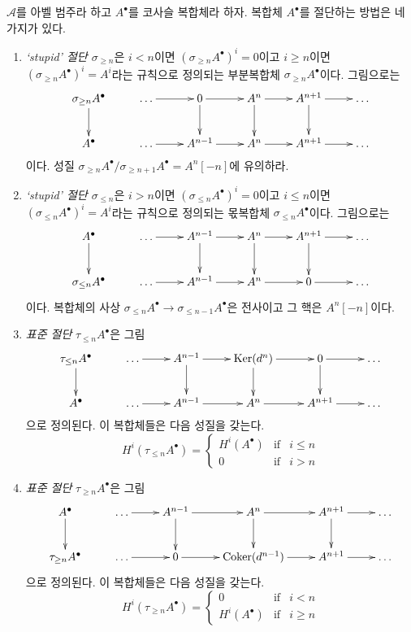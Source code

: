 \noindent
$\mathcal{A}$를 아벨 범주라 하고 $A^\bullet$를 코사슬 복합체라 하자.
복합체 $A^\bullet$를 절단하는 방법은 네 가지가 있다.
\begin{enumerate}
\item {\it ‘stupid’ 절단 $\sigma_{\geq n}$}은
$i < n$이면 $(\sigma_{\geq n} A^\bullet)^i = 0$이고
$i \geq n$이면 $(\sigma_{\geq n} A^\bullet)^i = A^i$라는 규칙으로
정의되는 부분복합체 $\sigma_{\geq n} A^\bullet$이다. 그림으로는
$$
\xymatrix{
\sigma_{\geq n}A^\bullet \ar[d]  &
\ldots \ar[r] &
0 \ar[r] \ar[d] &
A^n \ar[r] \ar[d] &
A^{n + 1} \ar[r] \ar[d] &
\ldots \\
A^\bullet  &
\ldots \ar[r] &
A^{n - 1} \ar[r] &
A^n \ar[r] &
A^{n + 1} \ar[r] &
\ldots
}
$$
이다. 성질
$\sigma_{\geq n}A^\bullet / \sigma_{\geq n + 1}A^\bullet
= A^n[-n]$에 유의하라.
\item {\it ‘stupid’ 절단 $\sigma_{\leq n}$}은
$i > n$이면 $(\sigma_{\leq n} A^\bullet)^i = 0$이고
$i \leq n$이면 $(\sigma_{\leq n} A^\bullet)^i = A^i$라는 규칙으로
정의되는 몫복합체 $\sigma_{\leq n} A^\bullet$이다. 그림으로는
$$
\xymatrix{
A^\bullet \ar[d]  &
\ldots \ar[r] &
A^{n - 1} \ar[r] \ar[d] &
A^n \ar[r] \ar[d] &
A^{n + 1} \ar[r] \ar[d] &
\ldots \\
\sigma_{\leq n}A^\bullet &
\ldots \ar[r] &
A^{n - 1} \ar[r] &
A^n \ar[r] &
0 \ar[r] &
\ldots \\
}
$$
이다. 복합체의 사상
$\sigma_{\leq n}A^\bullet \to \sigma_{\leq n - 1}A^\bullet$은
전사이고 그 핵은 $A^n[-n]$이다.
\item {\it 표준 절단} $\tau_{\leq n}A^\bullet$은 그림
$$
\xymatrix{
\tau_{\leq n}A^\bullet \ar[d]  &
\ldots \ar[r] &
A^{n - 1} \ar[r] \ar[d] &
\Ker(d^n) \ar[r] \ar[d] &
0 \ar[r] \ar[d] &
\ldots \\
A^\bullet  &
\ldots \ar[r] &
A^{n - 1} \ar[r] &
A^n \ar[r] &
A^{n + 1} \ar[r] &
\ldots
}
$$
으로 정의된다. 이 복합체들은 다음 성질을 갖는다.
$$
H^i(\tau_{\leq n}A^\bullet) =
\left\{
\begin{matrix}
H^i(A^\bullet) & \text{if} & i \leq n \\
0 & \text{if} & i > n
\end{matrix}
\right.
$$
\item {\it 표준 절단} $\tau_{\geq n}A^\bullet$은 그림
$$
\xymatrix{
A^\bullet \ar[d] &
\ldots \ar[r] &
A^{n - 1} \ar[r] \ar[d] &
A^n \ar[r] \ar[d] &
A^{n + 1} \ar[r] \ar[d] &
\ldots \\
\tau_{\geq n}A^\bullet &
\ldots \ar[r] &
0 \ar[r] &
\Coker(d^{n - 1}) \ar[r] &
A^{n + 1} \ar[r] &
\ldots
}
$$
으로 정의된다. 이 복합체들은 다음 성질을 갖는다.
$$
H^i(\tau_{\geq n}A^\bullet) =
\left\{
\begin{matrix}
0 & \text{if} & i < n \\
H^i(A^\bullet) & \text{if} & i \geq n
\end{matrix}
\right.
$$
\end{enumerate}


